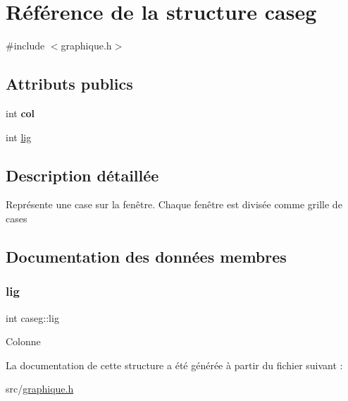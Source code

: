 \hypertarget{structcaseg}{}\section{Référence de la structure caseg}
\label{structcaseg}


{\ttfamily \#include $<$graphique.\+h$>$}

\subsection*{Attributs publics}
\begin{DoxyCompactItemize}
\item 
\mbox{\label{structcaseg_a6263769710ea6e644e50f21c193928ca}} 
int {\bfseries col}
\item 
int \hyperlink{structcaseg_a0bb7d293c6b04521f3b22a49745073a6}{lig}
\end{DoxyCompactItemize}


\subsection{Description détaillée}
Représente une case sur la fenêtre. Chaque fenêtre est divisée comme grille de cases 

\subsection{Documentation des données membres}
\mbox{\label{structcaseg_a0bb7d293c6b04521f3b22a49745073a6}} 
\subsubsection{\texorpdfstring{lig}{lig}}
{\footnotesize\ttfamily int caseg\+::lig}

Colonne 

La documentation de cette structure a été générée à partir du fichier suivant \+:\begin{DoxyCompactItemize}
\item 
src/\hyperlink{graphique_8h}{graphique.\+h}\end{DoxyCompactItemize}
